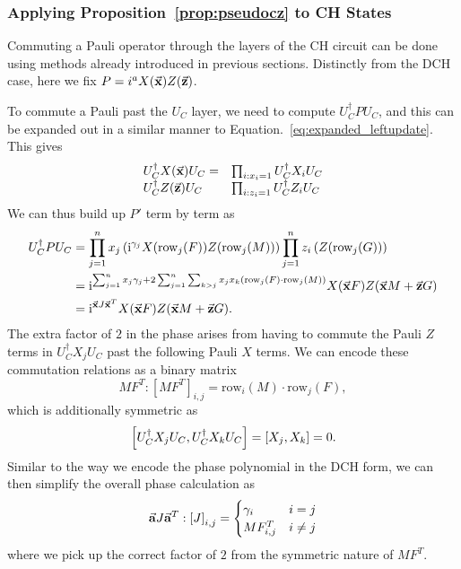 \subsubsection*{Applying Proposition~\ref{prop:pseudocz} to CH States}
Commuting a Pauli operator through the layers of the CH circuit can be done using methods already introduced in previous sections. Distinctly from the DCH case, here we fix $P=i^{a}X(\va{x})Z(\va{z})$.\par
To commute a Pauli past the $U_{C}$ layer, we need to compute $U_{C}^{\dagger}PU_{C}$, and this can be expanded out in a similar manner to Equation.~\ref{eq:expanded_leftupdate}. This gives
\[
\begin{array}{l l}
U_{C}^{\dagger}X(\va{x})U_{C} = & \prod_{i:x_{i}=1}U_{C}^{\dagger}X_{i}U_{C}\\
U_{C}^{\dagger}Z(\va{z})U_{C} & \prod_{i:z_{i}=1}U_{C}^{\dagger}Z_{i}U_{C}
\end{array}
\]
We can thus build up $P'$ term by term as
\begin{align}
U_{C}^{\dagger}PU_{C} &= \prod_{j=1}^{n}x_{j}\left(\mathrm{i}^{\gamma_{j}}X(\text{row}_{j}(F))Z(\text{row}_{j}(M))\right)\prod_{j=1}^{n}z_{i}\left(Z(\text{row}_{j}(G))\right) \nonumber \\
&= \mathrm{i}^{\sum_{j=1}^{n} x_{j}\gamma_{j} + 2\sum_{j=1}^{n}\sum_{k>j}x_{j}x_{k}\left( \text{row}_{j}(F)\cdot\text{row}_{j}(M) \right)}X(\va{x}F)Z(\va{x}M+\va{z}G) \nonumber \\
&= \mathrm{i}^{\va{x}J\va{x}^{T}}X(\va{x}F)Z(\va{x}M+\va{z}G).
\label{eq:tableau_update_pauli}
\end{align}
The extra factor of $2$ in the phase arises from having to commute the Pauli $Z$ terms in $U_{C}^{\dagger}X_{j}U_{C}$ past the following Pauli $X$ terms. We can encode these commutation relations as a binary matrix
\[MF^{T} : \left[MF^{T}\right]_{i,j} = \text{row}_{i}(M)\cdot \text{row}_{j}(F),\]
which is additionally symmetric as 
\[\comm{U_{C}^{\dagger}X_{j}U_{C}}{U_{C}^{\dagger}X_{k}U_{C}} = \comm{X_{j}}{X_{k}} = 0.\]
Similar to the way we encode the phase polynomial in the DCH form, we can then simplify the overall phase calculation as
\[\va{a}J\va{a}^{T} : \left[J\right]_{i,j} = \begin{cases} \gamma_{i} & i=j \\ MF^{T}_{i,j} & i\neq j \end{cases}\]
where we pick up the correct factor of $2$ from the symmetric nature of $MF^{T}$.

